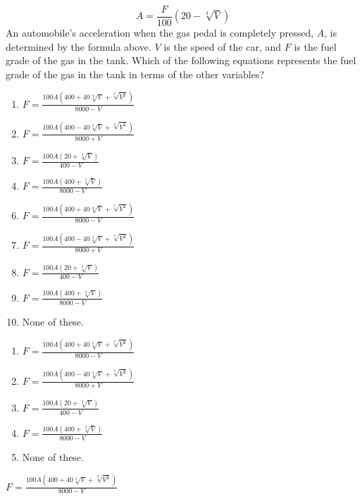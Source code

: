  
$$A=\frac{F}{100}(20-\sqrt[3]{V})$$
An automobile's acceleration when the gas pedal is completely pressed, $A$, is determined by the formula above.  $V$ is the speed of the car, and $F$ is the fuel grade of the gas in the tank.  Which of the following equations represents the fuel grade of the gas in the tank in terms of the other variables? 


\ifsat
	\begin{enumerate}[label=\Alph*)]
		\item {\Large$F=\frac{100A(400+40\sqrt[3]{V}+\sqrt[3]{V^2})}{8000-V} $ } %
		\item {\Large$F=\frac{100A(400-40\sqrt[3]{V}+\sqrt[3]{V^2})}{8000+V} $ }
		\item {\Large$F=\frac{100A(20+\sqrt[3]{V})}{400-V} $ }
		\item {\Large$F=\frac{100A(400+\sqrt[3]{V})}{8000-V} $}
	\end{enumerate}
\else
\fi

\ifacteven
	\begin{enumerate}[label=\textbf{\Alph*.},itemsep=\fill,align=left]
		\setcounter{enumii}{5}
		\item {\Large$F=\frac{100A(400+40\sqrt[3]{V}+\sqrt[3]{V^2})}{8000-V} $ } %
		\item {\Large$F=\frac{100A(400-40\sqrt[3]{V}+\sqrt[3]{V^2})}{8000+V} $ }
		\item {\Large$F=\frac{100A(20+\sqrt[3]{V})}{400-V} $ }
		\addtocounter{enumii}{1}
		\item {\Large$F=\frac{100A(400+\sqrt[3]{V})}{8000-V} $}
		\item None of these. 
	\end{enumerate}
\else
\fi

\ifactodd
	\begin{enumerate}[label=\textbf{\Alph*.},itemsep=\fill,align=left]
		\item {\Large$F=\frac{100A(400+40\sqrt[3]{V}+\sqrt[3]{V^2})}{8000-V} $ } %
		\item {\Large$F=\frac{100A(400-40\sqrt[3]{V}+\sqrt[3]{V^2})}{8000+V} $ }
		\item {\Large$F=\frac{100A(20+\sqrt[3]{V})}{400-V} $ }
		\item {\Large$F=\frac{100A(400+\sqrt[3]{V})}{8000-V} $}
		\item None of these. 
	\end{enumerate}
\else
\fi

\ifgridin
 {\Large$F=\frac{100A(400+40\sqrt[3]{V}+\sqrt[3]{V^2})}{8000-V} $ } %
		
\else
\fi

